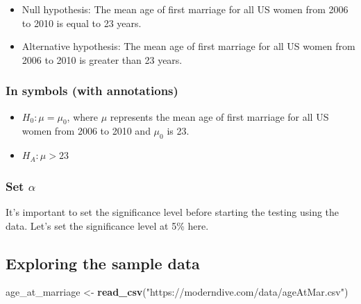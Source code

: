 \documentclass[12pt, krantz2,]{krantz}
\makeatletter
\newenvironment{Shaded}{\begin{snugshade}}{\end{snugshade}}
\newcommand{\KeywordTok}[1]{\textcolor[rgb]{0.27,0.27,0.27}{\textbf{#1}}}
\newcommand{\NormalTok}[1]{#1}
\newcommand{\StringTok}[1]{\textcolor[rgb]{0.5,0.5,0.5}{#1}}
\providecommand{\tightlist}{%
  \setlength{\itemsep}{0pt}\setlength{\parskip}{0pt}}
\newenvironment{kframe}{%
\medskip{}
\setlength{\fboxsep}{.8em}
 \def\at@end@of@kframe{}%
 \ifinner\ifhmode%
  \def\at@end@of@kframe{\end{minipage}}%
  \begin{minipage}{\columnwidth}%
 \fi\fi%
 \def\FrameCommand##1{\hskip\@totalleftmargin \hskip-\fboxsep
 \colorbox{shadecolor}{##1}\hskip-\fboxsep
     \hskip-\linewidth \hskip-\@totalleftmargin \hskip\columnwidth}%
 \MakeFramed {\advance\hsize-\width
   \@totalleftmargin\z@ \linewidth\hsize
   \@setminipage}}%
 {\par\unskip\endMakeFramed%
 \at@end@of@kframe}
\renewenvironment{Shaded}{\begin{kframe}}{\end{kframe}}
\makeatother
\begin{document}
\begin{itemize}
\item
  Null hypothesis: The mean age of first marriage for all US women from 2006 to 2010 is equal to 23 years.
\item
  Alternative hypothesis: The mean age of first marriage for all US women from 2006 to 2010 is greater than 23 years.
\end{itemize}

\hypertarget{in-symbols-with-annotations}{%
\subsubsection*{In symbols (with annotations)}\label{in-symbols-with-annotations}}


\begin{itemize}
\tightlist
\item
  \(H_0: \mu = \mu_{0}\), where \(\mu\) represents the mean age of first marriage for all US women from 2006 to 2010 and \(\mu_0\) is 23.
\item
  \(H_A: \mu > 23\)
\end{itemize}

\hypertarget{set-alpha}{%
\subsubsection*{\texorpdfstring{Set \(\alpha\)}{Set \textbackslash{}alpha}}\label{set-alpha}}


It's important to set the significance level before starting the testing using the data. Let's set the significance level at 5\% here.

\hypertarget{exploring-the-sample-data}{%
\subsection{Exploring the sample data}\label{exploring-the-sample-data}}

\begin{Shaded}
\begin{Highlighting}[]
\NormalTok{age_at_marriage <-}\StringTok{ }\KeywordTok{read_csv}\NormalTok{(}\StringTok{"https://moderndive.com/data/ageAtMar.csv"}\NormalTok{)}
\end{Highlighting}
\end{Shaded}
\end{document}
